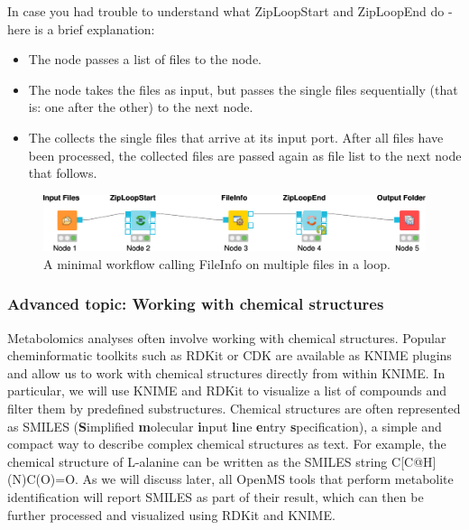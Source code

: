 In case you had trouble to understand what ZipLoopStart and ZipLoopEnd do - here is a brief explanation:
\begin{itemize}
\item
The   node passes a list of files to the  node.
\item
The  node takes the files as input, but passes the single files sequentially (that is: one after the other) to the next node. 
\item
The  collects the single files that arrive at its input port. After all files have been processed, the collected files are passed again as file list to the next node that follows.
\end{itemize}

\begin{figure}
\centering
\includegraphics[width=\textwidth]{graphics/knime_setup/Minimal_FileInfoLoop}
\caption{A minimal workflow calling FileInfo on multiple files in a loop.}
\label{fig:knime_minimal_loop}
\end{figure}

\subsubsection{Advanced topic: Working with chemical structures}
Metabolomics analyses often involve working with chemical structures. Popular cheminformatic toolkits such as RDKit or CDK are available as KNIME plugins and allow us to work with chemical structures directly from within KNIME. In particular, we will use KNIME and RDKit to visualize a list of compounds and filter them by predefined substructures. Chemical structures are often represented as SMILES (\textbf{S}implified \textbf{m}olecular \textbf{i}nput \textbf{l}ine \textbf{e}ntry \textbf{s}pecification), a simple and compact way to describe complex chemical structures as text. For example, the chemical structure of L-alanine can be written as the SMILES string C[C@H](N)C(O)=O. As we will discuss later, all OpenMS tools that perform metabolite identification will report SMILES as part of their result, which can then be further processed and visualized using RDKit and KNIME.

